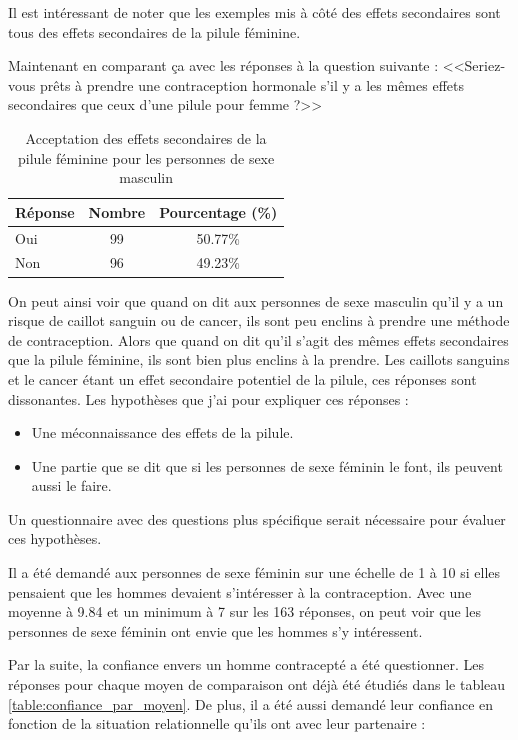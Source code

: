 \documentclass[12pt,a4paper]{report}
\begin{document}
Il est intéressant de noter que les exemples mis à côté des effets secondaires sont tous des effets secondaires de la pilule féminine.

Maintenant en comparant ça avec les réponses à la question suivante : <<Seriez-vous prêts à prendre une contraception hormonale s'il y a les mêmes effets secondaires que ceux d'une pilule pour femme ?>>

\begin{table}[H]
\centering
\begin{tabular}{|l|c|c|}
\hline
\textbf{Réponse} & \textbf{Nombre} & \textbf{Pourcentage (\%)} \\
\hline
Oui & 99 & 50.77\% \\
Non & 96 & 49.23\% \\
\hline
\end{tabular}
\caption{Acceptation des effets secondaires de la pilule féminine pour les personnes de sexe masculin}
\end{table}

On peut ainsi voir que quand on dit aux personnes de sexe masculin qu'il y a un risque de caillot sanguin ou de cancer, ils sont peu enclins à prendre une méthode de contraception. Alors que quand on dit qu'il s'agit des mêmes effets secondaires que la pilule féminine, ils sont bien plus enclins à la prendre. Les caillots sanguins et le cancer étant un effet secondaire potentiel de la pilule, ces réponses sont dissonantes. Les hypothèses que j'ai pour expliquer ces réponses :
\begin{itemize}
    \item Une méconnaissance des effets de la pilule.
    \item Une partie que se dit que si les personnes de sexe féminin le font, ils peuvent aussi le faire.
\end{itemize}
Un questionnaire avec des questions plus spécifique serait nécessaire pour évaluer ces hypothèses.

Il a été demandé aux personnes de sexe féminin sur une échelle de 1 à 10 si elles pensaient que les hommes devaient s'intéresser à la contraception. Avec une moyenne à 9.84 et un minimum à 7 sur les 163 réponses, on peut voir que les personnes de sexe féminin ont envie que les hommes s'y intéressent.

Par la suite, la confiance envers un homme contracepté a été questionner. Les réponses pour chaque moyen de comparaison ont déjà été étudiés dans le tableau \ref{table:confiance_par_moyen}. De plus, il a été aussi demandé leur confiance en fonction de la situation relationnelle qu'ils ont avec leur partenaire :
\end{document}
